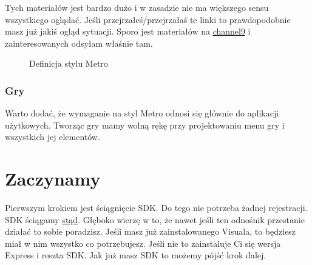 \documentclass[12pt, a4paper]{article}
\begin{document}
Tych materiałów jest bardzo dużo i w zasadzie nie ma większego sensu wszystkiego
oglądać. Jeśli przejrzałeś/przejrzałaś te linki to prawdopodobnie masz już
jakiś ogląd sytuacji.
 Sporo jest materiałów na
\href{http://channel9.msdn.com/}{channel9} i zainteresowanych odsyłam właśnie tam.

\begin{figure}[H]
		\begin{center}
		\caption{Definicja stylu Metro}		
		
		\end{center}
\end{figure}  

\subsubsection{Gry}
Warto dodać, że wymaganie na styl Metro odnosi się głównie do aplikacji
użytkowych. Tworząc gry mamy wolną rękę przy projektowaniu menu gry i wszystkich
jej elementów.

\section{Zaczynamy}
Pierwszym krokiem jest ściągnięcie SDK. Do tego nie potrzeba żadnej rejestracji.
SDK ściągamy
\href{http://www.microsoft.com/en-us/download/details.aspx?id=27570}{stąd}.
Głęboko wierzę w to, że nawet jeśli ten odnośnik przestanie działać to sobie
poradzisz. Jeśli masz już zainstalowanego Visuala, to będziesz miał w nim
wszystko co potrzebujesz. Jeśli nie to zainstaluje Ci się wersja Express i
reszta SDK.
Jak już masz SDK to możemy pójść krok dalej.
\end{document}
